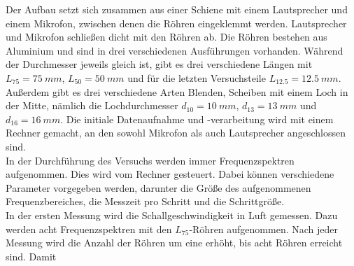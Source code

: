 
Der Aufbau setzt sich zusammen aus einer Schiene mit einem Lautsprecher und einem Mikrofon, zwischen denen die Röhren eingeklemmt werden.
Lautsprecher und Mikrofon schließen dicht mit den Röhren ab.
Die Röhren bestehen aus Aluminium und sind in drei verschiedenen Ausführungen vorhanden.
Während der Durchmesser jeweils gleich ist, gibt es drei verschiedene Längen mit $L_{75} = \SI{75}{mm}$, $L_{50} = \SI{50}{mm}$ und für die letzten Versuchsteile $L_{12.5} = \SI{12.5}{mm}$.
Außerdem gibt es drei verschiedene Arten Blenden, Scheiben mit einem Loch in der Mitte, nämlich die Lochdurchmesser $d_{10} = \SI{10}{mm}$, $d_{13} = \SI{13}{mm}$ und $d_{16} = \SI{16}{mm}$.
Die initiale Datenaufnahme und -verarbeitung wird mit einem Rechner gemacht, an den sowohl Mikrofon als auch Lautsprecher angeschlossen sind.\\
%
In der Durchführung des Versuchs werden immer Frequenzspektren aufgenommen.
Dies wird vom Rechner gesteuert.
Dabei können verschiedene Parameter vorgegeben werden, darunter die Größe des aufgenommenen Frequenzbereiches, die Messzeit pro Schritt und die Schrittgröße.\\
In der ersten Messung wird die Schallgeschwindigkeit in Luft gemessen.
Dazu werden acht Frequenzspektren mit den $L_{75}$-Röhren aufgenommen.
Nach jeder Messung wird die Anzahl der Röhren um eine erhöht, bis acht Röhren erreicht sind.
Damit 

